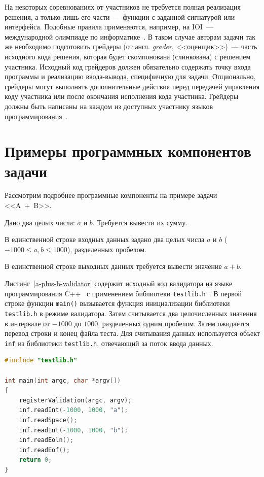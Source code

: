 \documentclass[times,specification,annotation]{style/itmo-student-thesis/itmo-student-thesis}
\begin{document}
На некоторых соревнованиях от участников не требуется полная реализация решения, а только лишь его части~--- функции с заданной сигнатурой или интерфейса. Подобные правила применяются, например, на IOI~--- международной олимпиаде по информатике~\cite{ioi-rules}. В таком случае авторам задачи так же необходимо подготовить грейдеры (от англ. \textit{grader}, <<оценщик>>)~--- часть исходного кода решения, которая будет скомпонована (слинкована) с решением участника. Исходный код грейдеров должен обязательно содержать точку входа программы и реализацию ввода-вывода, специфичную для задачи. Опционально, грейдеры могут выполнять дополнительные действия перед передачей управления коду участника или после окончания исполнения кода участника. Грейдеры должны быть написаны на каждом из доступных участнику языков программирования~\cite{cf-graders}.

\section{Примеры программных компонентов задачи}

Рассмотрим подробнее программные компоненты на примере задачи <<A~+~B>>.

Дано два целых числа: $a$ и $b$. Требуется вывести их сумму.

В единственной строке входных данных задано два целых числа $a$ и $b$ ($-1000 \le a, b \le 1000$), разделенных пробелом.

В единственной строке выходных данных требуется вывести значение $a + b$.

Листинг~\ref{a-plus-b-validator} содержит исходный код валидатора на языке программирования C++~\cite{cppbook} с применением библиотеки \texttt{testlib.h}~\cite{cf-testlib}. В первой строке функции \texttt{main()} вызывается функция инициализации библиотеки \texttt{testlib.h} в режиме валидатора. Затем считывается два целочисленных значения в интервале от $-1000$ до $1000$, разделенных одним пробелом. Затем ожидается перевод строки и конец файла теста. Для считывания данных используется объект \texttt{inf} из библиотеки \texttt{testlib.h}, отвечающий за поток ввода данных.

\begin{lstlisting}[float=!h,caption={Пример валидатора},label={a-plus-b-validator},language=c++]
#include "testlib.h"

int main(int argc, char *argv[])
{
    registerValidation(argc, argv);
    inf.readInt(-1000, 1000, "a");
    inf.readSpace();
    inf.readInt(-1000, 1000, "b");
    inf.readEoln();
    inf.readEof();
    return 0;
}
\end{lstlisting}
\end{document}
